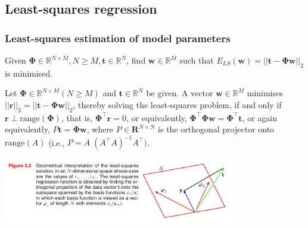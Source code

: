 \subsection{Least-squares regression}

\begin{frame}
    \frametitle{Least-squares estimation of model parameters
    \citep{trefethenAndBau97}}

    \scriptsize
    \begin{probDef}
        Given $\boldsymbol{\Phi}\in\mathbb{R}^{N\times M},N\ge
        M,\mathbf{t}\in\mathbb{R}^N$, find $\mathbf{w}\in\mathbb{R}^M$ such
        that $E_{LS}(\mathbf{w})=||\mathbf{t}-\boldsymbol{\Phi}\boldsymbol{w}||_2$ is minimised.
    \end{probDef}
    \begin{theorem}
        Let $\boldsymbol{\Phi}\in\mathbb{R}^{N\times M} (N\ge M)$ and
        $\mathbf{t}\in\mathbb{R}^N$ be given. A vector
        $\mathbf{w}\in\mathbb{R}^M$ minimises
        $||\mathbf{r}||_2=||\mathbf{t}-\boldsymbol{\Phi}\mathbf{w}||_2$, thereby solving the
        least-squares problem, if and only if
        $\mathbf{r}\perp\text{range}(\boldsymbol{\Phi})$, that is,
        $\boldsymbol{\Phi}^\intercal\mathbf{r}=0$,
        or equivalently,
        $\boldsymbol{\Phi}^\intercal\boldsymbol{\Phi}\mathbf{w}=\boldsymbol\Phi^\intercal\mathbf{t}$,
        or again equivalently,
        $P\mathbf{t}=\boldsymbol{\Phi}\mathbf{w}$,
        where $P\in\mathbf{R}^{N\times N}$ is the orthogonal projector onto
        $\text{range}(A)$ (i.e., $P=A\;(A^\intercal A)^{-1}A^\intercal)$.

    \end{theorem}
	\begin{center}
		\includegraphics[width=4in]{figures/leastSquares.png}
	\end{center}
    \hfill\scriptsize\citet{bishop06}
    \normalsize

\end{frame}

